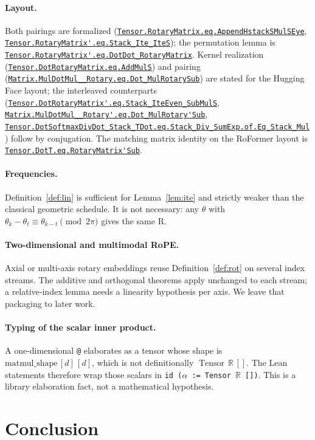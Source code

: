 \documentclass[11pt,a4paper]{article}
\newcommand{\lmod}[1]{\href{http://www.lemma.cn/lean/?module=#1}{\nolinkurl{#1}}}
\newcommand{\R}{\mathbb{R}}
\newcommand{\Tensor}{\operatorname{Tensor}}
\newcommand{\rot}{\mathrm{R}}
\begin{document}
\paragraph{Layout.}
Both pairings are formalized (\lmod{Tensor.RotaryMatrix.eq.AppendHstackSMulSEye}, \lmod{Tensor.RotaryMatrix'.eq.Stack_Ite_IteS}); the permutation lemma is \lmod{Tensor.RotaryMatrix'.eq.DotDot_RotaryMatrix}.
Kernel realization (\lmod{Tensor.DotRotaryMatrix.eq.AddMulS}) and pairing (\lmod{Matrix.MulDotMul__Rotary.eq.Dot_MulRotarySub}) are stated for the Hugging Face layout; the interleaved counterparts (\lmod{Tensor.DotRotaryMatrix'.eq.Stack_IteEven_SubMulS}, \lmod{Matrix.MulDotMul__Rotary'.eq.Dot_MulRotary'Sub}, \lmod{Tensor.DotSoftmaxDivDot_Stack_TDot.eq.Stack_Div_SumExp.of.Eq_Stack_Mul}) follow by conjugation.
The matching matrix identity on the RoFormer layout is \lmod{Tensor.DotT.eq.RotaryMatrix'Sub}.

\paragraph{Frequencies.}
Definition~\ref{def:lin} is sufficient for Lemma~\ref{lem:ite} and strictly weaker than the classical geometric schedule.
It is not necessary: any \(\theta\) with
\(\theta_k-\theta_t\equiv\theta_{k-t}\pmod{2\pi}\)
gives the same \(\rot\).

\paragraph{Two-dimensional and multimodal RoPE.}
Axial or multi-axis rotary embeddings reuse Definition~\ref{def:rot} on several index streams.
The additive and orthogonal theorems apply unchanged to each stream; a relative-index lemma needs a linearity hypothesis per axis.
We leave that packaging to later work.

\paragraph{Typing of the scalar inner product.}
A one-dimensional \texttt{@} elaborates as a tensor whose shape is
\(\mathrm{matmul\_shape}\,[d]\,[d]\),
which is not definitionally \(\Tensor\,\R\,[]\).
The Lean statements therefore wrap those scalars in
\texttt{id ($\alpha$ := Tensor \(\R\) [])}.
This is a library elaboration fact, not a mathematical hypothesis.

\section{Conclusion}
\label{sec:conclusion}
\end{document}
